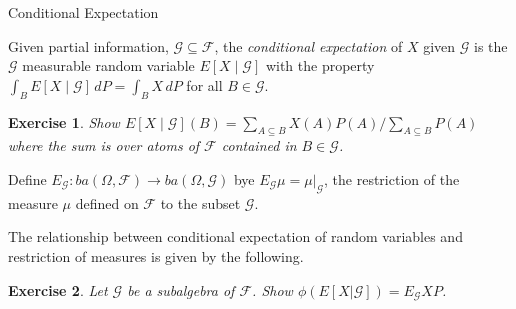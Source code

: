 \documentclass[fleqn]{amsart}
\newcommand{\F}{\mathcal{F}}
\newcommand{\G}{\mathcal{G}}
\newtheorem{exercise}{Exercise}
\begin{document}
\begin{section}{Conditional Expectation}

Given partial information, $\G\subseteq\F$, the
{\em conditional expectation} of $X$ given $\G$ is the $\G$ measurable
random variable $E[X\mid\G]$ with the property $\int_B E[X\mid\G]\,dP =
\int_B X\,dP$ for all $B\in\G$.

\begin{exercise}
Show $E[X\mid\G](B) = \sum_{A\subseteq B} X(A)P(A)/\sum_{A\subseteq B}P(A)$
where the sum is over atoms of $\F$ contained in $B\in\G$.
\end{exercise}

Define $E_\G\colon ba(\Omega,\F) \to ba(\Omega, \G)$ bye
$E_\G\mu = \mu|_\G$, the restriction of the measure $\mu$ defined
on $\F$ to the subset $\G$.

The relationship between conditional expectation of random variables
and restriction of measures is given by the following.

\begin{exercise}
Let $\G$ be a subalgebra of $\F$.
Show $\phi(E[X|\G]) = E_\G XP$.
\end{exercise}

\end{section}
\end{document}

